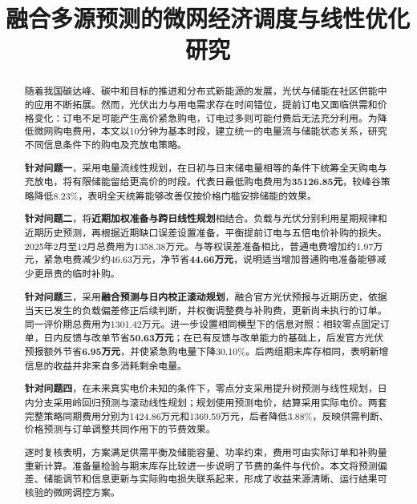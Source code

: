 \title{融合多源预测的微网经济调度与线性优化研究}
\date{}
\maketitle
\begingroup
{}
\begin{abstract}
\noindent\hspace*{2em}随着我国碳达峰、碳中和目标的推进和分布式新能源的发展，光伏与储能在社区供能中的应用不断拓展。然而，光伏出力与用电需求存在时间错位，提前订电又面临供需和价格变化：订电不足可能产生高价紧急购电，订电过多则可能付费后无法充分利用。为降低微网购电费用，本文以10分钟为基本时段，建立统一的电量流与储能状态关系，研究不同信息条件下的购电及充放电策略。

\textbf{针对问题一}，采用电量流线性规划，在日初与日末储电量相等的条件下统筹全天购电与充放电，将有限储能留给更高价的时段。代表日最低购电费用为\textbf{35126.85元}，较峰谷策略降低8.23\%，表明全天统筹能够改善仅按价格门槛安排储能的效果。

\textbf{针对问题二}，将\textbf{近期加权准备与跨日线性规划}相结合。负载与光伏分别利用星期规律和近期历史预测，再根据近期缺口误差设置准备，平衡提前订电与五倍电价补购的损失。2025年2月至12月总费用为1358.38万元。与等权误差准备相比，普通电费增加约1.97万元，紧急电费减少约46.63万元，净节省\textbf{44.66万元}，说明适当增加普通购电准备能够减少更昂贵的临时补购。

\textbf{针对问题三}，采用\textbf{融合预测与日内校正滚动规划}，融合官方光伏预报与近期历史，依据当天已发生的负载偏差修正后续判断，并权衡调整费与补购费，更新尚未执行的订单。同一评价期总费用为1301.42万元。进一步设置相同模型下的信息对照：相较零点固定订单，日内反馈与改单节省\textbf{50.63万元}；在已有反馈与改单能力的基础上，后发官方光伏预报额外节省\textbf{6.95万元}，并使紧急购电量下降30.10\%。后两组期末库存相同，表明新增信息的收益并非来自多消耗剩余电量。

\textbf{针对问题四}，在未来真实电价未知的条件下，零点分支采用提升树预测与线性规划，日内分支采用岭回归预测与滚动线性规划；规划使用预测电价，结算采用实际电价。两套完整策略同期费用分别为1424.86万元和1369.59万元，后者降低3.88\%，反映供需判断、价格预测与订单调整共同作用下的节费效果。

逐时复核表明，方案满足供需平衡及储能容量、功率约束，费用可由实际订单和补购量重新计算。准备量检验与期末库存比较进一步说明了节费的条件与代价。本文将预测偏差、储能调节和信息更新与实际购电损失联系起来，形成了收益来源清晰、运行结果可核验的微网调控方案。
\end{abstract}
\par
\endgroup
